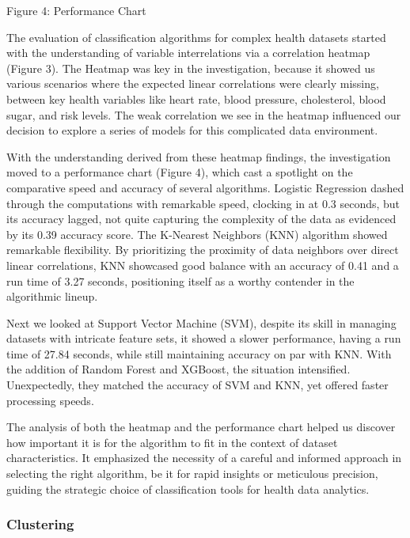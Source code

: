 \documentclass{article}
\begin{document}
\begin{multicols}{2}
{\small
  Figure 4: Performance Chart
  \par
  \vspace{6pt}
}

The evaluation of classification algorithms for complex health datasets started with the understanding of variable interrelations via a correlation heatmap (Figure 3). The Heatmap was key in the investigation, because it showed us various scenarios where the expected linear correlations were clearly missing, between key health variables like heart rate, blood pressure, cholesterol, blood sugar, and risk levels. The weak correlation we see in the heatmap influenced our decision to explore a series of models for this complicated data environment.

With the understanding derived from these heatmap findings, the investigation moved to a performance chart (Figure 4), which cast a spotlight on the comparative speed and accuracy of several algorithms. Logistic Regression dashed through the computations with remarkable speed, clocking in at 0.3 seconds, but its accuracy lagged, not quite capturing the complexity of the data as evidenced by its 0.39 accuracy score. The K-Nearest Neighbors (KNN) algorithm showed remarkable flexibility. By prioritizing the proximity of data neighbors over direct linear correlations, KNN showcased good balance with an accuracy of 0.41 and a run time of 3.27 seconds, positioning itself as a worthy contender in the algorithmic lineup.

Next we looked at Support Vector Machine (SVM), despite its skill in managing datasets with intricate feature sets, it showed a slower performance, having a run time of 27.84 seconds, while still maintaining accuracy on par with KNN. With the addition of Random Forest and XGBoost, the situation intensified. Unexpectedly, they matched the accuracy of SVM and KNN, yet offered faster processing speeds.

The analysis of both the heatmap and the performance chart helped us discover how important it is for the algorithm to fit in the context of dataset characteristics. It emphasized the necessity of a careful and informed approach in selecting the right algorithm, be it for rapid insights or meticulous precision, guiding the strategic choice of classification tools for health data analytics.


\subsubsection{Clustering}


\end{multicols}
\end{document}
